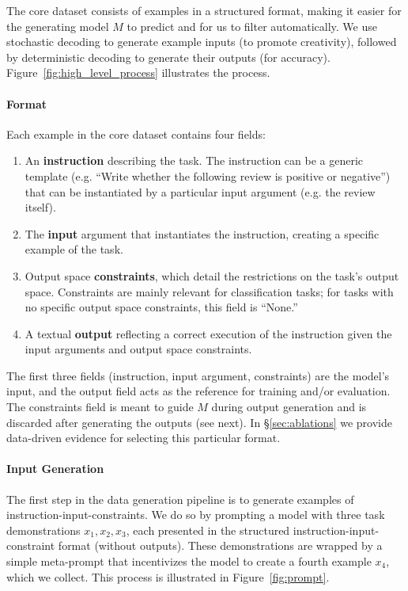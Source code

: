 The core dataset consists of examples in a structured format, making it easier for the generating model $M$ to predict and for us to filter automatically. We use stochastic decoding to generate example inputs (to promote creativity), followed by deterministic decoding to generate their outputs (for accuracy). Figure~\ref{fig:high_level_process} illustrates the process.

\paragraph{Format}
Each example in the core dataset contains four fields:

\begin{enumerate}[label=(\arabic*)]
\item An \textbf{instruction} describing the task. The instruction can be a generic template (e.g. ``Write whether the following review is positive or negative'') that can be instantiated by a particular input argument (e.g. the review itself).
\item The \textbf{input} argument that instantiates the instruction, creating a specific example of the task.
\item Output space \textbf{constraints}, which detail the restrictions on the task's output space. Constraints are mainly relevant for classification tasks; for tasks with no specific output space constraints, this field is ``None.''
\item A textual \textbf{output} reflecting a correct execution of the instruction given the input arguments and output space constraints.
\end{enumerate}

The first three fields (instruction, input argument, constraints) are the model's input, and the output field acts as the reference for training and/or evaluation. The constraints field is meant to guide $M$ during output generation and is discarded after generating the outputs (see next). In \S\ref{sec:ablations} we provide data-driven evidence for selecting this particular format.

\paragraph{Input Generation} The first step in the data generation pipeline is to generate examples of instruction-input-constraints. We do so by prompting a model with three task demonstrations $x_1, x_2, x_3$, each presented in the structured instruction-input-constraint format (without outputs). These demonstrations are wrapped by a simple meta-prompt that incentivizes the model to create a fourth example $x_4$, which we collect. This process is illustrated in Figure~\ref{fig:prompt}.

